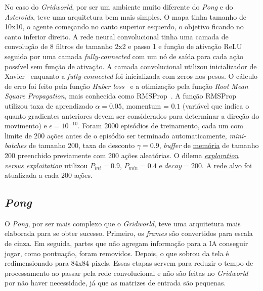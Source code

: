 No caso do \textit{Gridworld}, por ser um ambiente muito diferente do \textit{Pong} e do \textit{Asteroids}, teve uma arquitetura bem mais simples.
O mapa tinha tamanho de 10x10, o agente começando no canto superior esquerdo, o objetivo ficando no canto inferior direito.
A rede neural convolucional tinha uma camada de convolução de 8 filtros de tamanho 2x2 e passo 1 e função de ativação ReLU seguida por uma camada \textit{fully-connected} com um nó de saída para cada ação possível sem função de ativação.
A camada convolucional utilizou inicializador de Xavier~\cite{pmlr-v9-glorot10a} enquanto a \textit{fully-connected} foi inicializada com zeros nos pesos.
O cálculo de erro foi feito pela função \textit{Huber loss}~\cite{huber_loss} e a otimização pela função \textit{Root Mean Square Propagation}, mais conhecida como RMSProp~\cite{rmsprop}.
A função RMSProp utilizou taxa de aprendizado $\alpha = 0.05$, momentum = $0.1$ (variável que indica o quanto gradientes anteriores devem ser considerados para determinar a direção do movimento) e $\epsilon = 10^{-10}$.
Foram 2000 episódios de treinamento, cada um com limite de 200 ações antes de o episódio ser terminado automaticamente, \textit{mini-batches} de tamanho 200, taxa de desconto $\gamma = 0.9$, \textit{buffer} de \hyperref[sec:er]{memória} de tamanho 200 preenchido previamente com 200 ações aleatórias.
O dilema \hyperref[eq:exp_exp_prob]{\textit{exploration versus exploitation}} utilizou $P_{ini} = 0.9$, $P_{min} = 0.4$ e $decay = 200$.
A \hyperref[sec:ft]{rede alvo} foi atualizada a cada 200 ações.

\subsection{\textit{Pong}}
\label{sec:arq_pong}

O \textit{Pong}, por ser mais complexo que o \textit{Gridworld}, teve uma arquitetura mais elaborada para se obter sucesso.
Primeiro, os \textit{frames} são convertidos para escala de cinza.%
Em seguida, partes que não agregam informação para a IA conseguir jogar, como pontuação, foram removidos.
Depois, o que sobrou da tela é redimensionado para 84x84 pixels.
Essas etapas servem para reduzir o tempo de processamento ao passar pela rede convolucional e não são feitas no \textit{Gridworld} por não haver necessidade, já que as matrizes de entrada são pequenas.

